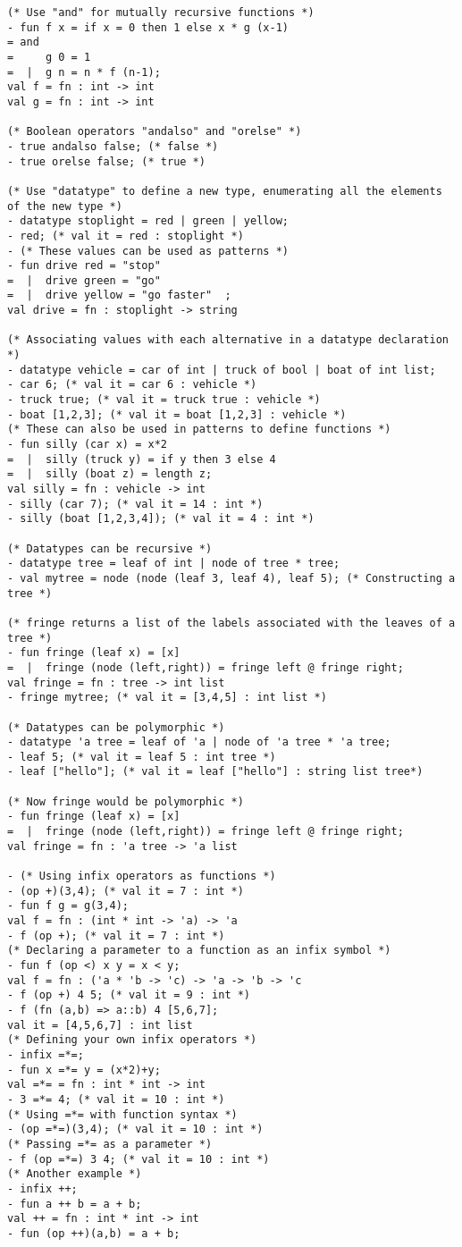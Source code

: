 \documentclass[10pt]{article}
\begin{document}
\begin{verbatim}
(* Use "and" for mutually recursive functions *)
- fun f x = if x = 0 then 1 else x * g (x-1)
= and 
=     g 0 = 1
=  |  g n = n * f (n-1);
val f = fn : int -> int
val g = fn : int -> int

(* Boolean operators "andalso" and "orelse" *)
- true andalso false; (* false *)
- true orelse false; (* true *)

(* Use "datatype" to define a new type, enumerating all the elements of the new type *)
- datatype stoplight = red | green | yellow;
- red; (* val it = red : stoplight *)
- (* These values can be used as patterns *)
- fun drive red = "stop"
=  |  drive green = "go"
=  |  drive yellow = "go faster"  ;
val drive = fn : stoplight -> string

(* Associating values with each alternative in a datatype declaration *)
- datatype vehicle = car of int | truck of bool | boat of int list;
- car 6; (* val it = car 6 : vehicle *)
- truck true; (* val it = truck true : vehicle *)
- boat [1,2,3]; (* val it = boat [1,2,3] : vehicle *)
(* These can also be used in patterns to define functions *)
- fun silly (car x) = x*2
=  |  silly (truck y) = if y then 3 else 4
=  |  silly (boat z) = length z;
val silly = fn : vehicle -> int
- silly (car 7); (* val it = 14 : int *)
- silly (boat [1,2,3,4]); (* val it = 4 : int *)

(* Datatypes can be recursive *)
- datatype tree = leaf of int | node of tree * tree;
- val mytree = node (node (leaf 3, leaf 4), leaf 5); (* Constructing a tree *)

(* fringe returns a list of the labels associated with the leaves of a tree *)
- fun fringe (leaf x) = [x]
=  |  fringe (node (left,right)) = fringe left @ fringe right;
val fringe = fn : tree -> int list
- fringe mytree; (* val it = [3,4,5] : int list *)

(* Datatypes can be polymorphic *)
- datatype 'a tree = leaf of 'a | node of 'a tree * 'a tree;
- leaf 5; (* val it = leaf 5 : int tree *)
- leaf ["hello"]; (* val it = leaf ["hello"] : string list tree*)

(* Now fringe would be polymorphic *)
- fun fringe (leaf x) = [x]
=  |  fringe (node (left,right)) = fringe left @ fringe right;
val fringe = fn : 'a tree -> 'a list

- (* Using infix operators as functions *)
- (op +)(3,4); (* val it = 7 : int *)
- fun f g = g(3,4);
val f = fn : (int * int -> 'a) -> 'a
- f (op +); (* val it = 7 : int *)
(* Declaring a parameter to a function as an infix symbol *)
- fun f (op <) x y = x < y;
val f = fn : ('a * 'b -> 'c) -> 'a -> 'b -> 'c
- f (op +) 4 5; (* val it = 9 : int *)
- f (fn (a,b) => a::b) 4 [5,6,7];
val it = [4,5,6,7] : int list
(* Defining your own infix operators *)
- infix =*=;
- fun x =*= y = (x*2)+y;
val =*= = fn : int * int -> int
- 3 =*= 4; (* val it = 10 : int *)
(* Using =*= with function syntax *)
- (op =*=)(3,4); (* val it = 10 : int *)
(* Passing =*= as a parameter *)
- f (op =*=) 3 4; (* val it = 10 : int *)
(* Another example *)
- infix ++;
- fun a ++ b = a + b;
val ++ = fn : int * int -> int
- fun (op ++)(a,b) = a + b;
\end{verbatim}
\end{document}
